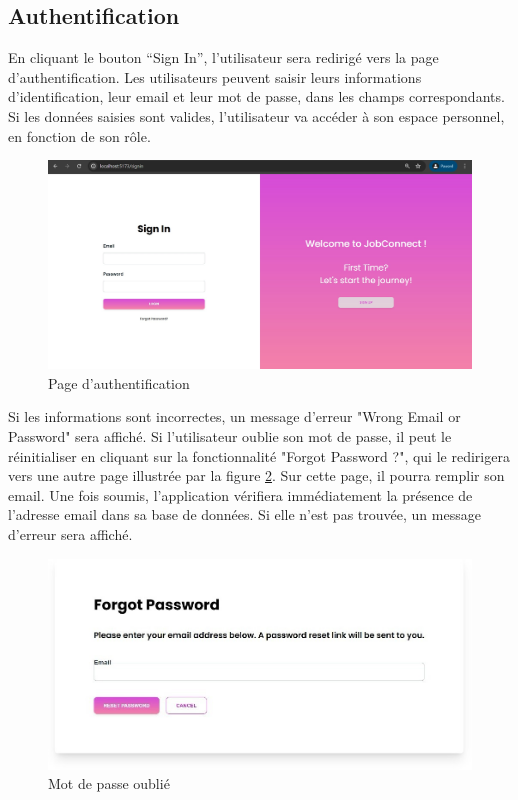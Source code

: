 \subsection{Authentification}
En cliquant le bouton “Sign In”, l’utilisateur sera redirigé vers la page d’authentification. 
Les utilisateurs peuvent saisir leurs  informations  d’identification, 
leur email et leur mot de passe, dans les champs correspondants. 
 Si les données saisies sont 
valides, l’utilisateur va accéder à son espace personnel, en fonction de 
son rôle.
\newline
\begin{figure}[htbp]
   \centering
   \includegraphics[scale=0.5]{screens/signin.jpg} 
   \caption{Page d'authentification}
   \label{fig:accueil}
\end{figure}

Si les informations sont incorrectes, un message d’erreur "Wrong Email or Password" 
sera affiché. Si l’utilisateur oublie son mot de passe, il peut le réinitialiser en 
cliquant sur la fonctionnalité "Forgot Password  ?",  qui  le redirigera vers une autre 
page illustrée par la figure \ref{fig:forgotPass}. Sur cette page, il pourra remplir 
son  email. Une  fois soumis, l'application vérifiera immédiatement la présence de 
l'adresse email dans sa base de données. Si elle n'est pas trouvée, un message d’erreur 
sera affiché. 
\newline
\begin{figure}[htbp]
   \centering
   \includegraphics[scale=0.6]{screens/forgot.jpg} 
   \caption{Mot de passe oublié}
   \label{fig:forgotPass}
\end{figure}
\vspace{5cm}

